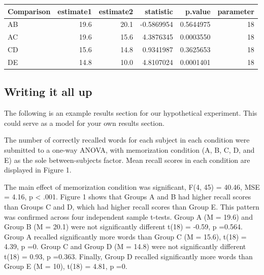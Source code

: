 \begin{tabular}{l|r|r|r|r|r}
\hline
Comparison & estimate1 & estimate2 & statistic & p.value & parameter\\
\hline
AB & 19.6 & 20.1 & -0.5869954 & 0.5644975 & 18\\
\hline
AC & 19.6 & 15.6 & 4.3876345 & 0.0003550 & 18\\
\hline
CD & 15.6 & 14.8 & 0.9341987 & 0.3625653 & 18\\
\hline
DE & 14.8 & 10.0 & 4.8107024 & 0.0001401 & 18\\
\hline
\end{tabular}

\subsection{Writing it all up}\label{writing-it-all-up}

The following is an example results section for our hypothetical
experiment. This could serve as a model for your own results section.

The number of correctly recalled words for each subject in each
condition were submitted to a one-way ANOVA, with memorization condition
(A, B, C, D, and E) as the sole between-subjects factor. Mean recall
scores in each condition are displayed in Figure 1.

The main effect of memorization condition was significant, F(4, 45) =
40.46, MSE = 4.16, p \textless{} .001. Figure 1 shows that Groups A and
B had higher recall scores than Groups C and D, which had higher recall
scores than Group E. This pattern was confirmed across four independent
sample t-tests. Group A (M = 19.6) and Group B (M = 20.1) were not
significantly different t(18) = -0.59, p =0.564. Group A recalled
significantly more words than Group C (M = 15.6), t(18) = 4.39, p =0.
Group C and Group D (M = 14.8) were not significantly different t(18) =
0.93, p =0.363. Finally, Group D recalled significantly more words than
Group E (M = 10), t(18) = 4.81, p =0.

